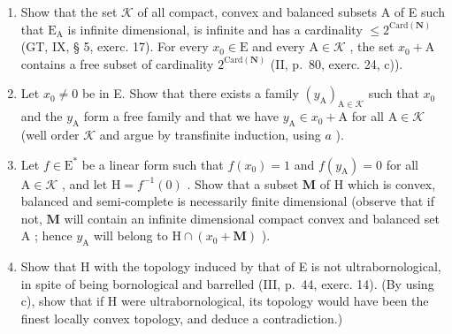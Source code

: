 \begin{enumerate}
\def\labelenumi{\alph{enumi})}
\item
  Show that the set \(\mathcal{K}\) of all compact, convex and balanced subsets A of E such that \(\mathrm{E_A}\) is infinite dimensional, is infinite and has a cardinality \(\leqslant 2^{\mathrm{Card}(\mathbf{N})}\) (GT, IX, § 5, exerc. 17). For every \(x_0 \in \mathrm{E}\) and every \(\mathrm{A} \in \mathcal{K}\) , the set \(x_0 + \mathrm{A}\) contains a free subset of cardinality \(2^{\mathrm{Card}(\mathbf{N})}\) (II, p.~80, exerc. 24, c)).
\item
  Let \(x_0 \neq 0\) be in E. Show that there exists a family \((y_{\mathrm{A}})_{\mathrm{A} \in \mathcal{K}}\) such that \(x_0\) and the \(y_{\mathrm{A}}\) form a free family and that we have \(y_{\mathrm{A}} \in x_0 + \mathrm{A}\) for all \(\mathrm{A} \in \mathcal{K}\) (well order \(\mathcal{K}\) and argue by transfinite induction, using \(a\) ).
\item
  Let \(f \in \mathrm{E}^{*}\) be a linear form such that \(f(x_0) = 1\) and \(f(y_{\mathrm{A}}) = 0\) for all \(\mathrm{A} \in \mathcal{K}\) , and let \(\mathrm{H} = f^{-1}(0)\) . Show that a subset \(\mathbf{M}\) of \(\mathrm{H}\) which is convex, balanced and semi-complete is necessarily finite dimensional (observe that if not, \(\mathbf{M}\) will contain an infinite dimensional compact convex and balanced set \(\mathrm{A}\) ; hence \(y_{\mathrm{A}}\) will belong to \(\mathrm{H} \cap (x_0 + \mathbf{M})\) ).
\item
  Show that H with the topology induced by that of E is not ultrabornological, in spite of being bornological and barrelled (III, p.~44, exerc. 14). (By using c), show that if H were ultrabornological, its topology would have been the finest locally convex topology, and deduce a contradiction.)
\end{enumerate}

